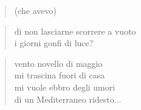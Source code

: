 \begin{verse}
    (che avevo)
\end{verse}

\begin{verse}
    di non lasciarne scorrere a vuoto\\
    i giorni gonfi di luce?
\end{verse}

\clearpage


\begin{verse}
    vento novello di maggio\\
    mi trascina fuori di casa\\
    mi vuole ebbro degli umori\\
    di un Mediterraneo ridesto...
\end{verse}
